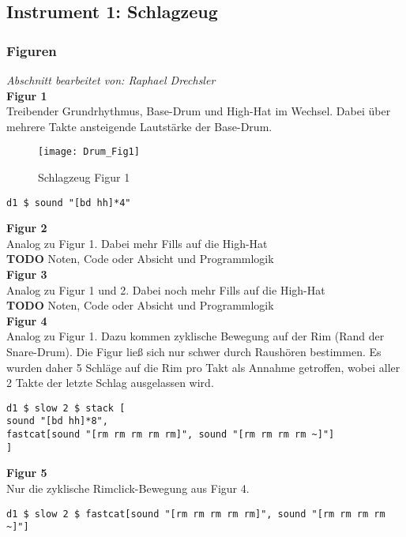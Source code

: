 \documentclass[
10pt, %
a4paper, %
oneside, %
headinclude,footinclude, %
BCOR5mm, %
]{scrartcl}
\begin{document}
\subsection{Instrument 1: Schlagzeug}
\subsubsection{Figuren}
\textit{Abschnitt bearbeitet von: Raphael Drechsler}\\

\noindent \textbf{Figur 1}\\
Treibender Grundrhythmus, Base-Drum und High-Hat im Wechsel. Dabei über mehrere Takte ansteigende Lautstärke der Base-Drum.
\begin{figure}[h]
	\centering 
	\texttt{[image: Drum\_Fig1]} 
	\caption{Schlagzeug Figur 1}
\end{figure}

\begin{lstlisting}
d1 $ sound "[bd hh]*4"
\end{lstlisting}

\noindent \textbf{Figur 2}\\
Analog zu Figur 1. Dabei mehr Fills auf die High-Hat\\
{\color{red}\textbf{TODO}} Noten, Code oder Absicht und Programmlogik\\

\noindent \textbf{Figur 3}\\
Analog zu Figur 1 und 2. Dabei noch mehr Fills auf die High-Hat\\
{\color{red}\textbf{TODO}} Noten, Code oder Absicht und Programmlogik\\

\noindent \textbf{Figur 4}\\
Analog zu Figur 1. Dazu kommen zyklische Bewegung auf der Rim (Rand der Snare-Drum).
Die Figur ließ sich nur schwer durch Raushören bestimmen. Es wurden daher 5 Schläge auf die Rim pro Takt als Annahme getroffen, wobei aller 2 Takte der letzte Schlag ausgelassen wird.

\begin{lstlisting}
d1 $ slow 2 $ stack [
sound "[bd hh]*8",
fastcat[sound "[rm rm rm rm rm]", sound "[rm rm rm rm ~]"]
]
\end{lstlisting}

\noindent \textbf{Figur 5}\\
Nur die zyklische Rimclick-Bewegung aus Figur 4.
\begin{lstlisting}
d1 $ slow 2 $ fastcat[sound "[rm rm rm rm rm]", sound "[rm rm rm rm ~]"]
\end{lstlisting}
\end{document}
